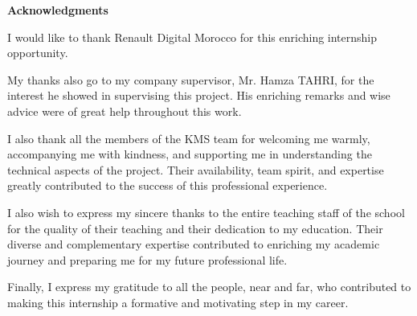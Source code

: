 \vspace*{1cm}
\begin{center}
    \textbf{\huge{Acknowledgments}}
\end{center}
\vspace{1cm}

\begin{doublespace}
    \large
    I would like to thank Renault Digital Morocco for this enriching internship opportunity.

    \vspace{0.5cm}

    My thanks also go to my company supervisor, Mr. Hamza TAHRI, for the interest he showed in supervising this project. His enriching remarks and wise advice were of great help throughout this work.

    \vspace{0.5cm}

    I also thank all the members of the KMS team for welcoming me warmly, accompanying me with kindness, and supporting me in understanding the technical aspects of the project. Their availability, team spirit, and expertise greatly contributed to the success of this professional experience.

    \vspace{0.5cm}

    I also wish to express my sincere thanks to the entire teaching staff of the school for the quality of their teaching and their dedication to my education. Their diverse and complementary expertise contributed to enriching my academic journey and preparing me for my future professional life.

    \vspace{0.5cm}

    Finally, I express my gratitude to all the people, near and far, who contributed to making this internship a formative and motivating step in my career.
\end{doublespace}

